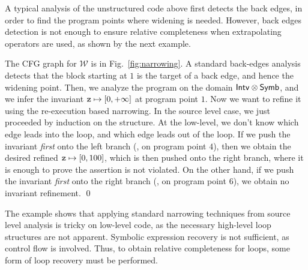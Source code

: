 \documentclass{llncs}
\newcommand{\comment}[1]{}
\begin{document}
A typical analysis of the unstructured code above first detects the
back edges, in order to find the program points where widening is needed.
However, back edges detection is not enough to ensure relative completeness when extrapolating operators are used, as shown by the next example.

\begin{example}
The CFG graph for $\mathcal{W}$ is in Fig.~\ref{fig:narrowing}.  A
standard back-edges analysis detects that the block starting at $1$ is
the target of a back edge, and hence the widening point.  Then, we
analyze the program on the domain $\mathsf{Intv} \otimes \mathsf{Symb}$, and
we infer the invariant $\mathtt{z} \mapsto [0, +\infty]$ at program
point $1$.  Now we want to refine it using the re-execution based
narrowing.  In the source level case, we just proceeded by induction
on the structure.  At the low-level, we don't know which edge leads
into the loop, and which edge leads out of the loop. If we push the
invariant \emph{first} onto the left branch (\ie, on program point
$4$), then we obtain the desired refined
$\mathtt{z} \mapsto [0, 100]$, which is then pushed onto the right
branch, where it is enough to prove the assertion is not violated.
On the other hand, if we push the invariant \emph{first} onto the right
branch (\ie, on program point $6$), we obtain no invariant refinement.
\qed
\end{example}

\comment{
\subsubsection{Discussion: Choosing the right narrowing operator.}
From the example above, it follows that in the low level world the use
of the re-execution based narrowing must be done with some care.  The
example implies that \emph{one} (decreasing) iteration is not enough
to ensure weak relative completeness.  An immediate solution to this
problem is to iterate the decreasing iterations until stabilization of
the full CFG.  The problem with such an approach is that it may
introduce unuseful computations.  For instance, in the example the
``right'' branch may be arbitrarily complex, so that the analysis may
go deep along that branch, and then because of the refinement induced
by the ``left'' branch, the same branch must be re-analyzed.  In the
worst case, this may introduce a quadratic (w.r.t. the number of
branches in the graph) slowdown of the analysis.  An improvement is to
pre-process the CFG, so to annotate each outgoing edge with
information whether there is a loop starting from that edge, and use
this information to schedule the blocks during the narrowing phase.

The preprocessing can be combined with domain-specific narrowings, so
to improve the overall precision of the analysis.  } The example shows
that applying standard narrowing techniques from source level analysis
is tricky on low-level code, as the necessary high-level loop
structures are not apparent. Symbolic expression recovery is not
sufficient, as control flow is involved. Thus, to obtain relative
completeness for loops, some form of loop recovery must be performed.
\end{document}
